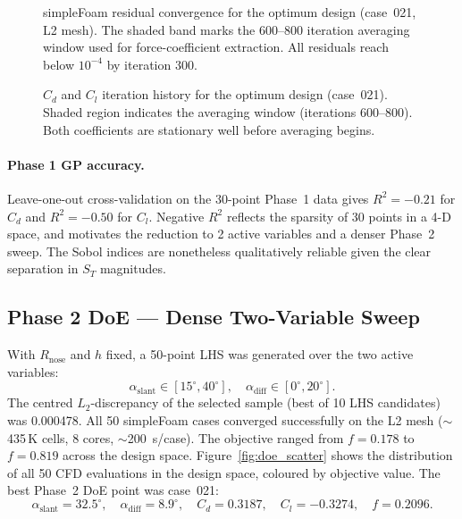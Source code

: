 \begin{figure}[h]
  \centering
  \caption{simpleFoam residual convergence for the optimum design (case~021, L2 mesh). The shaded band marks the 600--800 iteration averaging window used for force-coefficient extraction. All residuals reach below $10^{-4}$ by iteration 300.}
  \label{fig:residuals}
\end{figure}

\begin{figure}[h]
  \centering
  \caption{$C_d$ and $C_l$ iteration history for the optimum design (case~021). Shaded region indicates the averaging window (iterations 600--800). Both coefficients are stationary well before averaging begins.}
  \label{fig:forcecoeffs}
\end{figure}

\paragraph{Phase 1 GP accuracy.} Leave-one-out cross-validation on the 30-point Phase~1 data gives $R^2 = -0.21$ for $C_d$ and $R^2 = -0.50$ for $C_l$. Negative $R^2$ reflects the sparsity of 30 points in a 4-D space, and motivates the reduction to 2 active variables and a denser Phase~2 sweep. The Sobol indices are nonetheless qualitatively reliable given the clear separation in $S_T$ magnitudes.

\subsection{Phase 2 DoE — Dense Two-Variable Sweep}
\label{sec:doe_phase2}

With $R_\mathrm{nose}$ and $h$ fixed, a 50-point LHS was generated over the two active variables:
\[
  \alpha_\mathrm{slant} \in [15^\circ, 40^\circ], \quad
  \alpha_\mathrm{diff}  \in [0^\circ,  20^\circ].
\]
The centred $L_2$-discrepancy of the selected sample (best of 10 LHS candidates) was 0.000478. All 50 simpleFoam cases converged successfully on the L2 mesh ($\sim$435\,K cells, 8 cores, $\sim$200~s/case). The objective ranged from $f = 0.178$ to $f = 0.819$ across the design space. Figure~\ref{fig:doe_scatter} shows the distribution of all 50 CFD evaluations in the design space, coloured by objective value. The best Phase~2 DoE point was case~021:
\[
  \alpha_\mathrm{slant} = 32.5^\circ,\quad
  \alpha_\mathrm{diff}  = 8.9^\circ,\quad
  C_d = 0.3187,\quad C_l = -0.3274,\quad f = 0.2096.
\]

